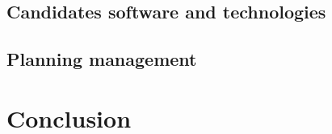 \documentclass[12pt]{article}
\begin{document}
\subsection{Candidates software and technologies}
\subsection {Planning management} 
\newpage
\section*{Conclusion}

\newpage


\end{document}
